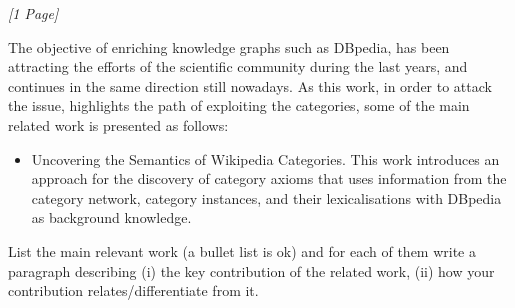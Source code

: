 \textit{[1 Page]}

The objective of enriching knowledge graphs such as DBpedia, has been attracting the efforts of the scientific community during the last years, and continues in the same direction still nowadays. As this work, in order to attack the issue, highlights the path of exploiting the categories, some of the main related work is presented as follows:
\begin{itemize}
  \item Uncovering the Semantics of Wikipedia Categories. \cite{HeistHeiko2019}
  This work introduces an approach for the discovery of category axioms that uses information from the category network, category instances, and their lexicalisations with DBpedia as background knowledge.
\end{itemize}

\noindent
List the main relevant work (a bullet list is ok) and for each of them write a paragraph describing (i) the key contribution of the related work, (ii) how your contribution relates/differentiate from it.
